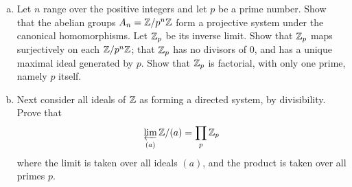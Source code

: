   \begin{ex}
    \begin{enumerate}[a)]
      \item Let $n$ range over the positive integers and let $p$ be a prime number. Show that the abelian groups $A_n={\mathbb Z}/p^n{\mathbb Z}$ form a projective system under the canonical homomorphisms. Let ${\mathbb Z}_p$ be its inverse limit. Show that ${\mathbb Z}_p$ maps surjectively on each ${\mathbb Z}/p^n{\mathbb Z}$; that ${\mathbb Z}_p$ has no divisors of $0$, and has a unique maximal ideal generated by $p$. Show that ${\mathbb Z}_p$ is factorial, with only one prime, namely $p$ itself.
      \item Next consider all ideals of ${\mathbb Z}$ as forming a directed system, by divisibility. Prove that
               \begin{equation*}
                 \operatorname*{\underleftarrow{\lim}}_{(a)} {\mathbb Z}/(a) = \prod_p {\mathbb Z}_p
               \end{equation*}
               where the limit is taken over all ideals $(a)$, and the product is taken over all primes $p$.
    \end{enumerate}
  \end{ex}
